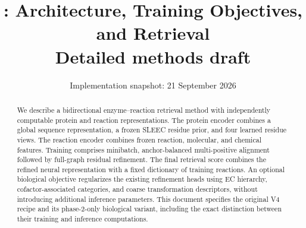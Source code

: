 \documentclass[11pt]{article}
\title{\methodname: Architecture, Training Objectives, and Retrieval\\\large Detailed methods draft}
\author{}
\date{Implementation snapshot: 21 September 2026}
\begin{document}
\maketitle
\begin{abstract}
We describe a bidirectional enzyme--reaction retrieval method with independently
computable protein and reaction representations. The protein encoder combines a
global sequence representation, a frozen SLEEC residue prior, and four learned
residue views. The reaction encoder combines frozen reaction, molecular, and
chemical features. Training comprises minibatch, anchor-balanced multi-positive
alignment followed by full-graph residual refinement. The final retrieval score
combines the refined neural representation with a fixed dictionary of training
reactions. An optional biological objective regularizes the existing refinement
heads using EC hierarchy, cofactor-associated categories, and coarse
transformation descriptors, without introducing additional inference parameters.
This document specifies the original V4 recipe and its phase-2-only biological
variant, including the exact distinction between their training and inference
computations.
\end{abstract}
\tableofcontents
\clearpage

\clearpage
\appendix

\clearpage

\begingroup
\raggedright

\endgroup
\end{document}
